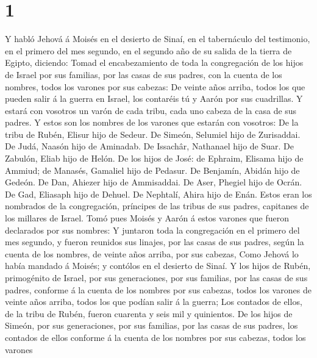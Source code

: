 \hypertarget{section}{%
\section{1}\label{section}}

 Y habló Jehová á Moisés en el desierto de Sinaí, en el
tabernáculo del testimonio, en el primero del mes segundo, en el segundo
año de su salida de la tierra de Egipto, diciendo:  Tomad el
encabezamiento de toda la congregación de los hijos de Israel por sus
familias, por las casas de sus padres, con la cuenta de los nombres,
todos los varones por sus cabezas:  De veinte años arriba,
todos los que pueden salir á la guerra en Israel, los contaréis tú y
Aarón por sus cuadrillas.  Y estará con vosotros un varón de
cada tribu, cada uno cabeza de la casa de sus padres.  Y
estos son los nombres de los varones que estarán con vosotros: De la
tribu de Rubén, Elisur hijo de Sedeur.  De Simeón, Selumiel
hijo de Zurisaddai.  De Judá, Naasón hijo de Aminadab.
 De Issachâr, Nathanael hijo de Suar.  De
Zabulón, Eliab hijo de Helón.  De los hijos de José: de
Ephraim, Elisama hijo de Ammiud; de Manasés, Gamaliel hijo de Pedasur.
 De Benjamín, Abidán hijo de Gedeón.  De Dan,
Ahiezer hijo de Ammisaddai.  De Aser, Phegiel hijo de
Ocrán.  De Gad, Eliasaph hijo de Dehuel.  De
Nephtalí, Ahira hijo de Enán.  Estos eran los nombrados de
la congregación, príncipes de las tribus de sus padres, capitanes de los
millares de Israel.  Tomó pues Moisés y Aarón á estos
varones que fueron declarados por sus nombres:  Y juntaron
toda la congregación en el primero del mes segundo, y fueron reunidos
sus linajes, por las casas de sus padres, según la cuenta de los
nombres, de veinte años arriba, por sus cabezas,  Como
Jehová lo había mandado á Moisés; y contólos en el desierto de Sinaí.
 Y los hijos de Rubén, primogénito de Israel, por sus
generaciones, por sus familias, por las casas de sus padres, conforme á
la cuenta de los nombres por sus cabezas, todos los varones de veinte
años arriba, todos los que podían salir á la guerra;  Los
contados de ellos, de la tribu de Rubén, fueron cuarenta y seis mil y
quinientos.  De los hijos de Simeón, por sus generaciones,
por sus familias, por las casas de sus padres, los contados de ellos
conforme á la cuenta de los nombres por sus cabezas, todos los varones
